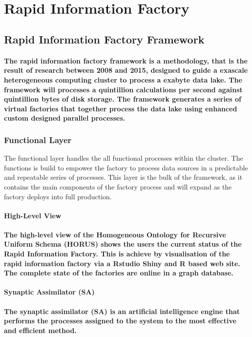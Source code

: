 \documentclass{acm_proc_article-sp}
\begin{document}
\section{Rapid Information Factory}
\subsection{Rapid Information Factory Framework}
\paragraph{The rapid information factory framework is a methodology, that is the result of research between 2008 and 2015, designed to guide a exascale \cite{bergman2008exascale} heterogeneous computing cluster to process a exabyte data lake. The framework will processes a quintillion calculations per second against quintillion bytes of disk storage. The framework generates a series of virtual factories that together process the data lake using enhanced custom designed parallel processes.}
\subsubsection{Functional Layer}
The functional layer handles the all functional processes within the cluster.
The functions is build to empower the factory to process data sources in a predictable and repeatable series of processes.
This layer is the bulk of the framework, as it contains the main components of the factory process and will expand as the factory deploys into full production.
\paragraph{\textbf{High-Level View}}
\paragraph{The high-level view of the Homogeneous Ontology for Recursive Uniform Schema (HORUS) shows the users the current status of the Rapid Information Factory. This is achieve by visualisation of the rapid information factory via a Rstudio Shiny \cite{ortega2013combining} and R \cite{team2000r} based web site. The complete state of the factories are online in a graph database.}
\paragraph{\textbf{Synaptic Assimilator (SA)}}
\paragraph{The synaptic assimilator (SA) is an artificial intelligence \cite{o2013artificial} engine that performs the processes assigned to the system to the most effective and efficient method.}
\end{document}
